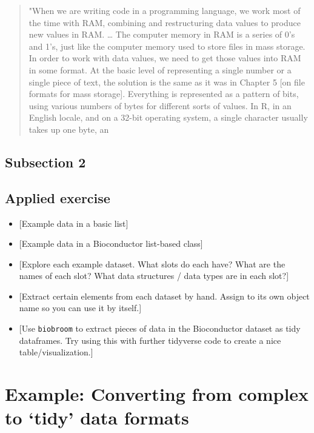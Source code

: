\documentclass[]{tufte-book}
\providecommand{\tightlist}{%
  \setlength{\itemsep}{0pt}\setlength{\parskip}{0pt}}
\begin{document}
\begin{quote}
"When we are writing code in a programming language, we work most of the time with RAM,
combining and restructuring data values to produce new values in RAM. \ldots{} The computer memory
in RAM is a series of 0's and 1's, just like the computer memory used to store files in mass
storage. In order to work with data values, we need to get those values into RAM in some
format. At the basic level of representing a single number or a single piece of text, the
solution is the same as it was in Chapter 5 {[}on file formats for mass storage{]}. Everything
is represented as a pattern of bits, using various numbers of bytes for different sorts of
values. In R, in an English locale, and on a 32-bit operating system, a single character
usually takes up one byte, an
\end{quote}

\hypertarget{subsection-2}{%
\subsection{Subsection 2}\label{subsection-2}}

\hypertarget{applied-exercise}{%
\subsection{Applied exercise}\label{applied-exercise}}

\begin{itemize}
\tightlist
\item
  {[}Example data in a basic list{]}
\item
  {[}Example data in a Bioconductor list-based class{]}
\item
  {[}Explore each example dataset. What slots do each have? What are the names of each slot?
  What data structures / data types are in each slot?{]}
\item
  {[}Extract certain elements from each dataset by hand. Assign to its own object name so
  you can use it by itself.{]}
\item
  {[}Use \texttt{biobroom} to extract pieces of data in the Bioconductor dataset as tidy dataframes.
  Try using this with further tidyverse code to create a nice table/visualization.{]}
\end{itemize}

\hypertarget{example-converting-from-complex-to-tidy-data-formats}{%
\section{Example: Converting from complex to `tidy' data formats}\label{example-converting-from-complex-to-tidy-data-formats}}
\end{document}

